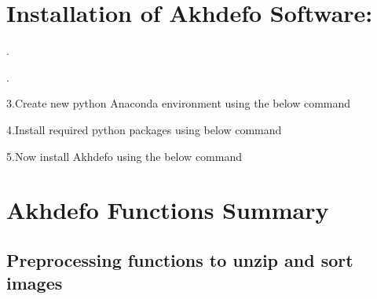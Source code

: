 \documentclass[letterpaper,10pt]{sphinxmanual}
\begin{document}
\chapter{Installation of Akhdefo Software:}
\label{\detokenize{README:installation-of-akhdefo-software}}
.

.

\sphinxAtStartPar
3.Create new python Anaconda environment using the below command

\begin{sphinxVerbatim}[commandchars=\\\{\}]
    

\end{sphinxVerbatim}

\sphinxAtStartPar
4.Install required python packages using below command

\begin{sphinxVerbatim}[commandchars=\\\{\}]
   
\end{sphinxVerbatim}

\sphinxAtStartPar
5.Now install Akhdefo using the below command

\begin{sphinxVerbatim}[commandchars=\\\{\}]
  
\end{sphinxVerbatim}


\chapter{Akhdefo Functions Summary}
\label{\detokenize{README:akhdefo-functions-summary}}

\section{Preprocessing functions to unzip and sort images}
\label{\detokenize{README:preprocessing-functions-to-unzip-and-sort-images}}
\begin{sphinxVerbatim}[commandchars=\\\{\}]
      
\end{sphinxVerbatim}
\end{document}
